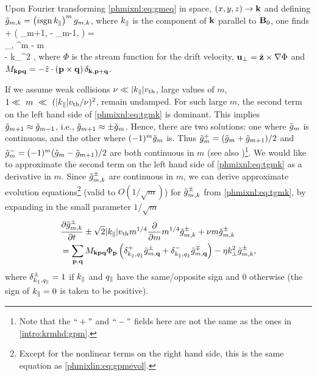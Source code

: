Upon Fourier transforming \eqref{phmixnl:eq:gmeq} in space, $(x, y, z) \to \mathbf{k}$ and
defining $\tilde g_{m,k} =
\left(i {\rm sgn}\, k_\parallel\right)^m g_{m,k}$, where $k_\parallel$ is the component of $\mathbf{k}$ parallel to
$\mathbf{B}_0$, one finds
\bea
     +  \lt( \tg_{m+1,} -
     \tg_{m-1, } \rt) = \nonumber \\
    \sum_{, } \Mkpq {}^m \Phip \tgmq 
    - \nu m \tgmk \nonumber \\- \eta k_\perp^2 \tgmk, \label{phmixnl:eq:tgmk}
\eea
where $\Phi$ is the stream function for the drift velocity, $\mathbf{u_\perp} =
\hat{\mathbf{z}}\times \nabla \Phi$ and $M_{\mathbf{kpq}} = - \hat{z} \cdot (\mathbf{p} \times \mathbf{q})\, \delta_{\mathbf{k},\mathbf{p+q}}$.

If we assume weak collisions $\nu \ll |k_\parallel| v_{\rm th}$, large values of $m$,
$1\ll~m~\ll~(|k_\parallel|v_{\rm th}/\nu)^2$, remain undamped. 
For such large $m$, the second term on the left hand side of \eqref{phmixnl:eq:tgmk} is dominant. This implies $\tilde g_{m+1} \approx
\tilde g_{m-1}$, i.e., $\tilde g_{m+1} \approx \pm \tilde g_m$. Hence, there are two solutions: one
where $\tilde g_m$ is continuous, and the other where $(-1)^m \tilde g_m$ is. Thus $\tilde g_m^+ =
(\tilde g_m+\tilde g_{m+1})/2$ and $\tilde g_m^-=(-1)^m(\tilde g_m - \tilde g_{m+1})/2$ are both continuous in $m$
(see also )\footnote{Note that the $``+"$ and $``-"$ fields here are not
the same as the ones in \eqref{intro:krmhd:gpm}.}.
We would like to approximate the second term on the left hand side of \eqref{phmixnl:eq:tgmk} as a
derivative in $m$. Since $\tilde g_{m,k}^\pm$ are continuous in $m$, we can derive 
approximate evolution equations\footnote{Except
for the nonlinear terms on the right hand side, this is the same equation as
\eqref{phmixlin:eq:gpmevol}.} (valid to $O(1/\sqrt{m})$) for $\tilde g_{m,k}^\pm$ from
\eqref{phmixnl:eq:tgmk}, by expanding in the small parameter $1/\sqrt{m}$
\begin{align}
    &\frac{\partial \tilde g_{m,k}^\pm}{\partial t} \pm \sqrt{2} |k_\parallel| v_{\rm th} m^{1/4} \frac{\partial }{\partial m} m^{1/4}
    \tilde g_{m,k}^\pm +
    \nu m \tilde g_{m,k}^\pm \nonumber \\
    & = \sum_{\mathbf{p},\mathbf{q}} M_{\mathbf{kpq}}
     \Phi_{\mathbf{p}} \left(\delta_{k_\parallel, q_\parallel}^+ \tilde g_{m,\mathbf{q}}^\pm +
     \delta_{k_\parallel, q_\parallel}^- \tilde g_{m,\mathbf{q}}^\mp \right) 
     - \eta k_\perp^2 \tilde g_{m,k}^\pm, \label{phmixnl:eq:gpm}
\end{align}
where $\delta_{k_\parallel,q_\parallel}^\pm = 1$ if $k_\parallel$ and $q_\parallel$ have the same/opposite
sign and 0 otherwise (the sign of $k_\parallel=0$ is taken to be positive).
%

